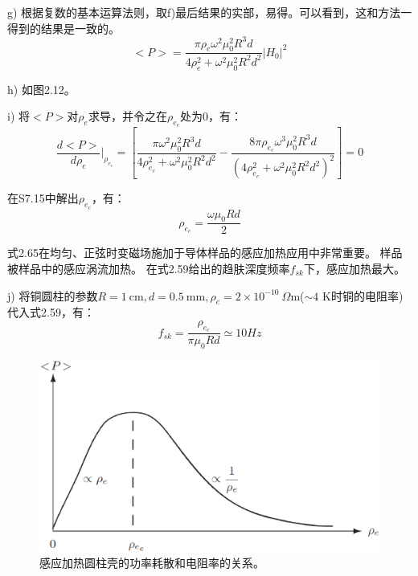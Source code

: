 g) 根据复数的基本运算法则，取f)最后结果的实部，易得。可以看到，这和方法一得到的结果是一致的。
\begin{equation*}
<P>=\frac{\pi \rho_e \omega^2 \mu_0^2 R^3 d}{4\rho_e^2+\omega^2 \mu_0^2 R^2 d^2}|H_0|^2 \tag{S7.14}
\end{equation*}

h) 如图2.12。

i) 将$<P>$对$\rho_e$求导，并令之在$\rho_{e_c}$处为0，有：
\begin{equation*}
\frac{d<P>}{d\rho_e} |_{\rho_{e_c}}=\left[\frac{\pi \omega^2 \mu_0^2 R^3 d}{4\rho_{e_c}^2+\omega^2 \mu_0^2 R^2 d^2}-\frac{8\pi \rho_{e_c} \omega^3 \mu_0^2 R^3 d}{(4\rho_{e_c}^2+\omega^2 \mu_0^2 R^2 d^2)^2}\right]=0 \tag{S7.15}
\end{equation*}

在S7.15中解出$\rho_{e_c}$，有：
\begin{equation*}
\rho_{e_c}=\frac{\omega \mu_0 R d}{2} \tag{2.65}
\end{equation*}

式2.65在均匀、正弦时变磁场施加于导体样品的感应加热应用中非常重要。
样品被样品中的感应涡流加热。
在式2.59给出的趋肤深度频率$f_{sk}$下，感应加热最大。

j) 将铜圆柱的参数$R=1\ \mathrm{cm}, d=0.5\ \mathrm{mm},\rho_e=2\times 10^{-10}\ \Omega\mathrm{m}$($\sim 4$ K时铜的电阻率)代入式2.59，有：
\begin{equation*}
f_{sk}=\frac{\rho_{e_c}}{\pi\mu_0 R d}\simeq 10Hz \tag{2.59}
\end{equation*}

\begin{figure}[htbp]
  \centering
 \includegraphics[scale=0.4]{chpt2/figs/fig2.12.eps}
  \caption{感应加热圆柱壳的功率耗散和电阻率的关系。}
\end{figure}

